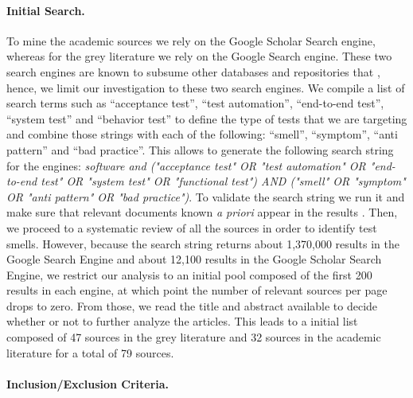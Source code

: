 \paragraph{\textbf{Initial Search.}}

To mine the academic sources we rely on the Google Scholar Search engine, whereas for the grey literature we rely on the Google Search engine. These two search engines are known to subsume other databases and repositories that \cite{Garousi2018}, hence, we limit our investigation to these two search engines. We compile a list of search terms such as ``acceptance test'', ``test automation'', ``end-to-end test'', ``system test'' and ``behavior test'' to define the type of tests that we are targeting and combine those strings with each of the following: ``smell'', ``symptom'', ``anti pattern'' and ``bad practice''. This allows to generate the following search string for the engines: \emph{software and ("acceptance test" OR "test automation" OR "end-to-end test" OR "system test" OR "functional test") AND ("smell" OR "symptom" OR "anti pattern" OR "bad practice")}. To validate the search string we run it and make sure that relevant documents known \emph{a priori} appear in the results \cite{Kitchenham2007, Ricca2021}. 
Then, we proceed to a systematic review of all the sources in order to identify test smells. However, because the search string returns about 1,370,000 results in the Google Search Engine and about 12,100 results in the Google Scholar Search Engine, we restrict our analysis to an initial pool composed of the first 200 results in each engine, at which point the number of relevant sources per page drops to zero. From those, we read the title and abstract available to decide whether or not to further analyze the articles. This leads to a initial list composed of 47 sources in the grey literature and 32 sources in the academic literature for a total of 79 sources.

\paragraph{\textbf{Inclusion/Exclusion Criteria.}}

